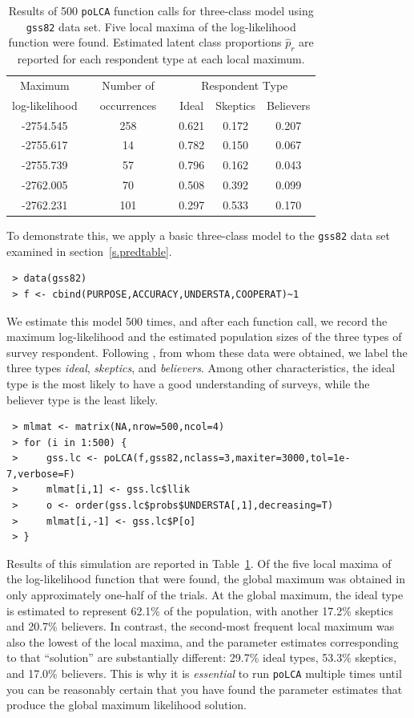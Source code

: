 \documentclass[letterpaper,12pt]{article}
\begin{document}
\begin{table} \centering
\begin{tabular}{ccccccc}
Maximum         & & Number of   & & \multicolumn{3}{c}{Respondent Type} \\
log-likelihood  & & occurrences & & Ideal & Skeptics & Believers  \\
\hline
-2754.545       & &         258 & & 0.621 & 0.172 & 0.207 \\
-2755.617       & &          14 & & 0.782 & 0.150 & 0.067 \\
-2755.739       & &          57 & & 0.796 & 0.162 & 0.043 \\
-2762.005       & &          70 & & 0.508 & 0.392 & 0.099 \\
-2762.231       & &         101 & & 0.297 & 0.533 & 0.170 \\
\hline
\end{tabular}
\caption{Results of 500 \texttt{poLCA} function calls for three-class model using \texttt{gss82} data set.  Five local maxima of the log-likelihood function were found. Estimated latent class proportions $\hat p_r$ are reported for each respondent type at each local maximum.} \label{t.llmaxima}
\end{table}

To demonstrate this, we apply a basic three-class model to the \texttt{gss82} data set examined in section~\ref{s.predtable}.
\begin{verbatim}
 > data(gss82)
 > f <- cbind(PURPOSE,ACCURACY,UNDERSTA,COOPERAT)~1
\end{verbatim}
We estimate this model 500 times, and after each function call, we record the maximum log-likelihood and the estimated population sizes of the three types of survey respondent. Following \citet{McCutcheon1987}, from whom these data were obtained, we label the three types \emph{ideal}, \emph{skeptics}, and \emph{believers}.  Among other characteristics, the ideal type is the most likely to have a good understanding of surveys, while the believer type is the least likely.
\begin{verbatim}
 > mlmat <- matrix(NA,nrow=500,ncol=4)
 > for (i in 1:500) {
 >     gss.lc <- poLCA(f,gss82,nclass=3,maxiter=3000,tol=1e-7,verbose=F)
 >     mlmat[i,1] <- gss.lc$llik
 >     o <- order(gss.lc$probs$UNDERSTA[,1],decreasing=T)
 >     mlmat[i,-1] <- gss.lc$P[o]
 > }
\end{verbatim}
Results of this simulation are reported in Table~\ref{t.llmaxima}. Of the five local maxima of the log-likelihood function that were found, the global maximum was obtained in only approximately one-half of the trials.  At the global maximum, the ideal type is estimated to represent 62.1\% of the population, with another 17.2\% skeptics and 20.7\% believers.  In contrast, the second-most frequent local maximum was also the lowest of the local maxima, and the parameter estimates corresponding to that ``solution'' are substantially different: 29.7\% ideal types, 53.3\% skeptics, and 17.0\% believers. This is why it is \emph{essential} to run \texttt{poLCA} multiple times until you can be reasonably certain that you have found the parameter estimates that produce the global maximum likelihood solution.
\end{document}
